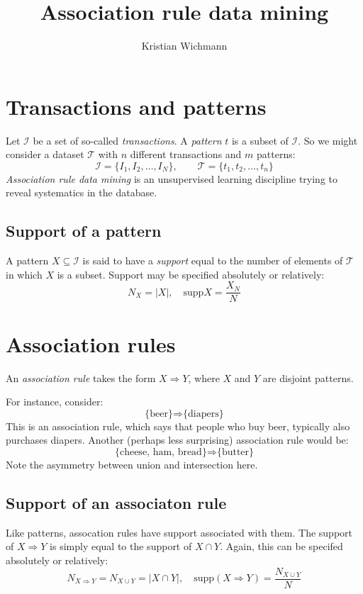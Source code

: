 \documentclass[12pt, a4paper]{article}
\title{Association rule data mining}
\author{Kristian Wichmann}
\numberwithin{equation}{section}
\begin{document}
\maketitle

\section{Transactions and patterns}
Let $\mathcal{I}$ be a set of so-called \textit{transactions}. A \textit{pattern} $t$ is a subset of $\mathcal{I}$. So we might consider a dataset $\mathcal{T}$ with $n$ different transactions and $m$ patterns:
\begin{equation}
\mathcal{I}=\{I_1, I_2,\ldots,I_N\},\qquad \mathcal{T}=\{t_1, t_2,\ldots,t_n\}
\end{equation}
\textit{Association rule data mining} is an unsupervised learning discipline trying to reveal systematics in the database.

\subsection{Support of a pattern}
A pattern $X\subseteq\mathcal{I}$ is said to have a \textit{support} equal to the number of elements of $\mathcal{T}$ in which $X$ is a subset. Support may be specified absolutely or relatively:
\begin{equation}
N_X=|X|,\quad\textrm{supp}X=\frac{X_N}{N}
\end{equation}

\section{Association rules}
An \textit{association rule} takes the form $X\Rightarrow Y$, where $X$ and $Y$ are disjoint patterns.

For instance, consider:
\begin{equation}
\textrm{\{beer\}}\Rightarrow\textrm{\{diapers\}}
\end{equation}
This is an association rule, which says that people who buy beer, typically also purchases diapers. Another (perhaps less surprising) association rule would be:
\begin{equation}
\textrm{\{cheese, ham, bread\}}\Rightarrow\textrm{\{butter\}}
\end{equation}
Note the asymmetry between union and intersection here.

\subsection{Support of an associaton rule}
Like patterns, assocation rules have support associated with them. The support of $X\Rightarrow Y$ is simply equal to the support of $X\cap Y$. Again, this can be specifed absolutely or relatively:
\begin{equation}
N_{X\Rightarrow Y}=N_{X\cup Y}=|X\cap Y|,\quad\textrm{supp}(X\Rightarrow Y)=\frac{N_{X\cup Y}}{N}
\end{equation}
\end{document}
